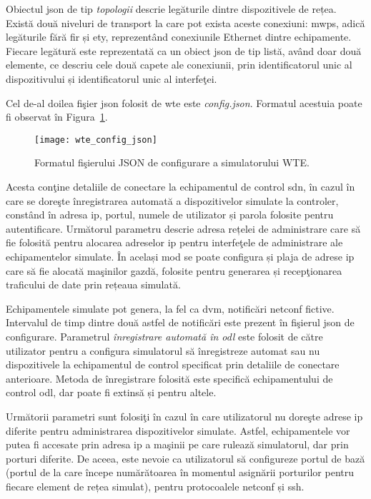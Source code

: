 Obiectul \gls{json} de tip \textit{topologii} descrie legăturile dintre dispozitivele de rețea. Există două niveluri de transport la care pot exista aceste conexiuni: \gls{mwps}, adică legăturile fără fir și \gls{ety}, reprezentând conexiunile Ethernet dintre echipamente. Fiecare legătură este reprezentată ca un obiect \gls{json} de tip listă, având doar două elemente, ce descriu cele două capete ale conexiunii, prin identificatorul unic al dispozitivului și identificatorul unic al interfeţei.

Cel de-al doilea fişier \gls{json} folosit de \gls{wte} este \textit{config.json}. Formatul acestuia poate fi observat în Figura~\ref{fig:wte_config_json}.

\begin{figure}[h]
	\centering
	\texttt{[image: wte\_config\_json]}
	\caption{Formatul fişierului JSON de configurare a simulatorului WTE.}
	\label{fig:wte_config_json}
\end{figure}

Acesta conţine detaliile de conectare la echipamentul de control \gls{sdn}, în cazul în care se doreşte înregistrarea automată a dispozitivelor simulate la controler, constând în adresa \gls{ip}, portul, numele de utilizator și parola folosite pentru autentificare. Următorul parametru descrie adresa rețelei de administrare care să fie folosită pentru alocarea adreselor \gls{ip} pentru interfeţele de administrare ale echipamentelor simulate. În același mod se poate configura și plaja de adrese \gls{ip} care să fie alocată maşinilor gazdă, folosite pentru generarea și recepţionarea traficului de date prin rețeaua simulată. 

Echipamentele simulate pot genera, la fel ca \gls{dvm}, notificări \gls{netconf} fictive. Intervalul de timp dintre două astfel de notificări este prezent în fişierul \gls{json} de configurare. Parametrul \textit{înregistrare automată în \gls{odl}} este folosit de către utilizator pentru a configura simulatorul să înregistreze automat sau nu dispozitivele la echipamentul de control specificat prin detaliile de conectare anterioare. Metoda de înregistrare folosită este specifică echipamentului de control \gls{odl}, dar poate fi extinsă și pentru altele.

Următorii parametri sunt folosiţi în cazul în care utilizatorul nu doreşte adrese \gls{ip} diferite pentru administrarea dispozitivelor simulate. Astfel, echipamentele vor putea fi accesate prin adresa \gls{ip} a maşinii pe care rulează simulatorul, dar prin porturi diferite. De aceea, este nevoie ca utilizatorul să configureze portul de bază (portul de la care începe numărătoarea în momentul asignării porturilor pentru fiecare element de rețea simulat), pentru protocoalele \gls{netconf} și \gls{ssh}.

